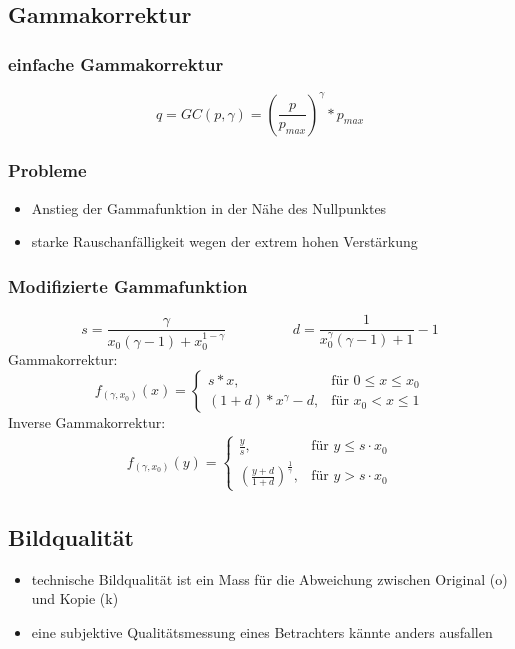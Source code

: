 \documentclass[10pt]{article}
\begin{document}
\subsection{Gammakorrektur}
\subsubsection*{einfache Gammakorrektur}
\begin{equation*}
	q = GC(p, \gamma) = \left( \frac{p}{p_{max}}\right)^\gamma * p_{max}
\end{equation*}
\subsubsection*{Probleme}
\begin{itemize}
	\item Anstieg der Gammafunktion in der Nähe des Nullpunktes
	\item starke Rauschanfälligkeit wegen der extrem hohen Verstärkung
\end{itemize}
\subsubsection*{Modifizierte Gammafunktion}
\begin{equation*}
	s = \frac{\gamma}{x_0(\gamma-1)+x_0^{1-\gamma}} \hspace{2cm} d = \frac{1}{x_0^\gamma(\gamma-1)+1}-1
\end{equation*}
Gammakorrektur:
\begin{equation*}
	f_{(\gamma, x_0)}(x) = \begin{cases}
		s * x, & \text{für } 0 \leq x \leq x_0 \\
		(1+d) * x^\gamma - d, & \text{für } x_0 < x \leq 1
	\end{cases}
\end{equation*}
Inverse Gammakorrektur:
\begin{align*}
	f_{(\gamma, x_0)}(y) = \begin{cases}
		\frac{y}{s}, & \text{für } y \leq s \cdot x_0 \\
		\left( \frac{y+d}{1+d} \right)^\frac{1}{\gamma}, & \text{für } y > s \cdot x_0
	\end{cases}
\end{align*}


\subsection{Bildqualität}
\begin{itemize}
	\item technische Bildqualität ist ein Mass für die Abweichung zwischen Original (o) und Kopie (k)
	\item eine subjektive Qualitätsmessung eines Betrachters kännte anders ausfallen
\end{itemize}
\end{document}

